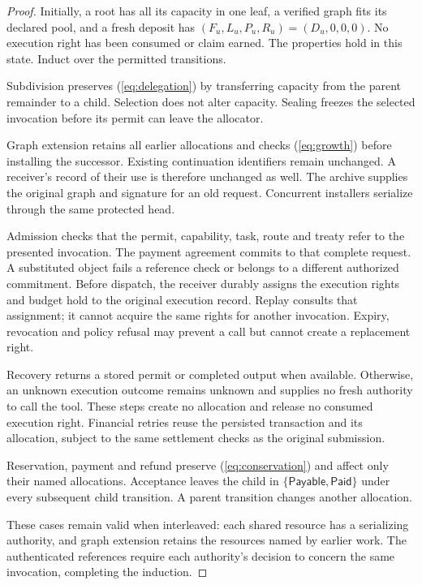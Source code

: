 \begin{proof}
Initially, a root has all its capacity in one leaf, a verified graph fits its
declared pool, and a fresh deposit has
$(F_u,L_u,P_u,R_u)=(D_u,0,0,0)$. No execution right has been consumed or claim
earned. The properties hold in this state. Induct over the permitted
transitions.

Subdivision preserves (\ref{eq:delegation}) by transferring capacity from the
parent remainder to a child. Selection does not alter capacity. Sealing freezes
the selected invocation before its permit can leave the allocator.

Graph extension retains all earlier allocations and checks (\ref{eq:growth})
before installing the successor. Existing continuation identifiers remain
unchanged. A receiver's record of their use is therefore unchanged as well.
The archive supplies the original graph and signature for an old request.
Concurrent installers serialize through the same protected head.

Admission checks that the permit, capability, task, route and treaty refer to
the presented invocation. The payment agreement commits to that complete
request. A substituted object fails a reference check or belongs to a different
authorized commitment. Before dispatch, the receiver durably assigns the
execution rights and budget hold to the original execution record. Replay
consults that assignment; it cannot acquire the same rights for another invocation.
Expiry, revocation and policy refusal may prevent a call but cannot create
a replacement right.

Recovery returns a stored permit or completed output when available. Otherwise,
an unknown execution outcome remains unknown and supplies no fresh authority
to call the tool. These steps create no allocation and release no consumed
execution right. Financial retries reuse the persisted transaction and its
allocation, subject to the same settlement checks as the original submission.

Reservation, payment and refund preserve (\ref{eq:conservation}) and affect only
their named allocations. Acceptance leaves the child in
$\{\textsf{Payable},\textsf{Paid}\}$ under every subsequent child transition.
A parent transition changes another allocation.

These cases remain valid when interleaved: each shared resource has a serializing
authority, and graph extension retains the resources named by earlier work.
The authenticated references require each authority's decision to concern the
same invocation, completing the induction.
\end{proof}

